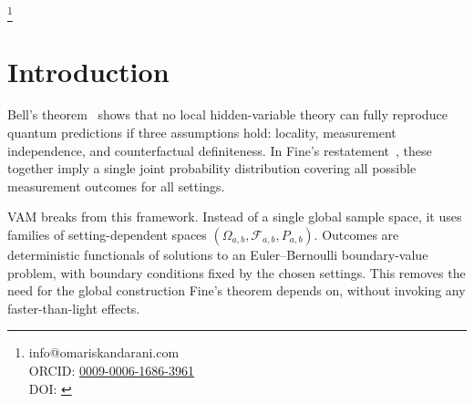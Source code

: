 \documentclass[twocolumn,aps,pre,floatfix,nofootinbib]{revtex4-2}
\begin{document}
    \title{\papertitle}
    \author{Omar Iskandarani}
    \thanks{info@omariskandarani.com \\
            ORCID: \href{https://orcid.org/0009-0006-1686-3961}{0009-0006-1686-3961} \\
            DOI: \href{https://doi.org/\paperdoi}{\paperdoi}
    }
    \date{\today}

    \begin{abstract}
        \vspace*{-0.5em}
        \section*{\centering Abstract}
        \vspace*{-1em}
The Vortex \AE ther Model (VAM) offers a local framework that can match the quantum violations of Bell inequalities without relying on superluminal signaling. It does so by rejecting the assumption that a single, setting-independent joint probability space underlies all measurement outcomes. Instead, it defines outcome statistics on field states that depend on the chosen settings. This paper reviews the theory behind VAM, places it alongside the two main strategies for avoiding Bell's theorem, and surveys experimental and theoretical results that help test or constrain such models.
    \end{abstract}
    \maketitle

\section{Introduction}
Bell's theorem~\cite{Bell1964,CHSH1969} shows that no local hidden-variable theory can fully reproduce quantum predictions if three assumptions hold:
locality, measurement independence, and counterfactual definiteness. In Fine's restatement~\cite{Fine1982}, these together imply a single joint probability distribution covering all possible measurement outcomes for all settings.

VAM breaks from this framework. Instead of a single global sample space, it uses families of setting-dependent spaces $(\Omega_{a,b}, \mathcal{F}_{a,b}, P_{a,b})$. Outcomes are deterministic functionals of solutions to an Euler--Bernoulli boundary-value problem, with boundary conditions fixed by the chosen settings. This removes the need for the global construction Fine's theorem depends on, without invoking any faster-than-light effects.
\end{document}
